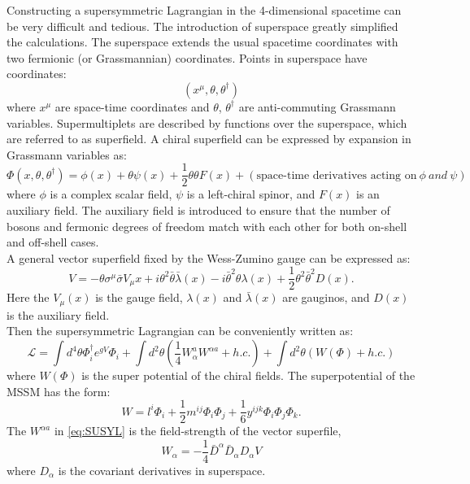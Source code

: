 \documentclass[thesis.tex]{subfiles}
\begin{document}
Constructing a supersymmetric Lagrangian in the 4-dimensional spacetime can be very difficult and tedious. 
The introduction of superspace greatly simplified the calculations. 
The superspace extends the usual spacetime coordinates with two fermionic (or Grassmannian) coordinates. 
Points in superspace have coordinates:
     \begin{equation}
	(x^\mu, \theta, \theta^\dagger)
     \end{equation}
where $x^\mu$ are space-time coordinates and $\theta$, $\theta^\dagger$ are anti-commuting Grassmann variables.
Supermultiplets are described by functions over the superspace, which are referred to as superfield. 
A chiral superfield can be expressed by expansion in Grassmann variables as:
    \begin{equation}
    \Phi(x, \theta, \theta^\dagger) = \phi(x) + \theta\psi(x) + \frac{1}{2}\theta\theta F(x) + (\text{space-time derivatives acting on}\ \phi \ {and}\  \psi)
    \end{equation}
 where $\phi$ is a complex scalar field, $\psi$ is a left-chiral spinor, and $F(x)$ is an auxiliary field. 
 The auxiliary field is introduced to ensure that the number of bosons and fermonic degrees of freedom match with each other for both on-shell and off-shell cases. \\
 A general vector superfield fixed by the Wess-Zumino gauge can be expressed as: 
 	\begin{equation}
		V = -\theta \sigma^\mu \bar{\sigma}V_\mu{x} + i\theta^2 \bar{\theta}\bar{\lambda}(x) -  i\bar{\theta}^2 \theta\lambda(x) + \frac{1}{2}\theta^2 \bar{\theta}^2 D(x).
	\end{equation}
Here the $V_\mu(x)$ is the gauge field, $\lambda(x)$ and $\bar{\lambda}(x)$ are gauginos, and $D(x)$ is the auxiliary field. \\
Then the supersymmetric Lagrangian can be conveniently written as: 
	\begin{equation}
		\mathcal{L} = \int d^4\theta \Phi_i^\dagger e^{gV}\Phi_i + \int d^2\theta (\frac{1}{4}W_\alpha^a W^{\alpha a} + h.c.) + \int d^2\theta (W(\Phi) + h.c.)
		 \label{eq:SUSYL}
	\end{equation}
where $W(\Phi)$ is the super potential of the chiral fields. The superpotential of the MSSM has the form: 
	\begin{equation}
		W = 	l^i\Phi_i + \frac{1}{2}m^{ij} \Phi_i \Phi_j + \frac{1}{6} y^{ijk} \Phi_i \Phi_j \Phi_k.
	\end{equation}
The $W^{\alpha a}$ in \ref{eq:SUSYL} is the field-strength of the vector superfile,
	\begin{equation}
		W_\alpha = - \frac{1}{4}\bar{D}^\alpha \bar{D}_\alpha D_\alpha V
	\end{equation}
where $D_\alpha$ is the covariant derivatives in superspace. 
\end{document}
